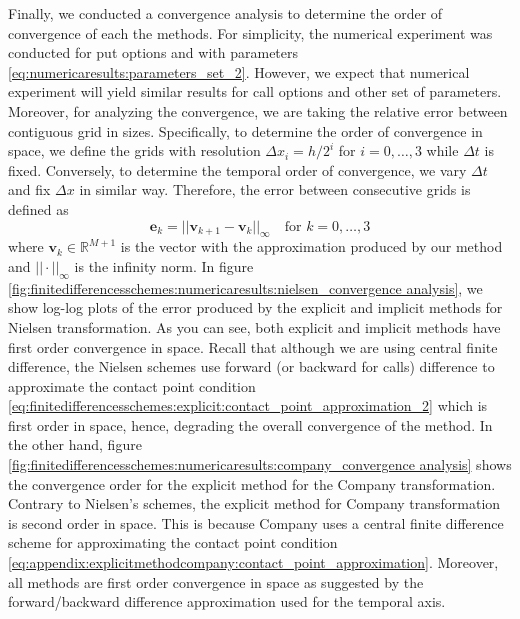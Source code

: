 Finally, we conducted a convergence analysis to determine the order of convergence of each the methods. For simplicity, the numerical experiment was conducted for put options and with parameters \eqref{eq:numericaresults:parameters_set_2}. However, we expect that numerical experiment will yield similar results for call options and other set of parameters. Moreover, for analyzing the convergence, we are taking the relative error between contiguous grid in sizes. Specifically, to determine the order of convergence in space, we define the grids with resolution $\Delta{x}_i=h/2^i$ for $i=0,\dots,3$ while $\Delta{t}$ is fixed. Conversely, to determine the temporal order of convergence, we vary $\Delta{t}$ and fix $\Delta{x}$ in similar way. Therefore, the error between consecutive grids is defined as
\begin{equation}
  \mathbf{e}_k = ||\mathbf{v}_{k+1} - \mathbf{v}_{k}||_{\infty} \quad \text{for $k=0,\dots,3$}
  \label{eq:finitedifferencesschemes:numericalresults:consecutive_error}
\end{equation}
where $\mathbf{v}_{k}\in\mathbb{R}^{M+1}$ is the vector with the approximation produced by our method and $||\cdot||_{\infty}$ is the infinity norm. In figure \eqref{fig:finitedifferencesschemes:numericaresults:nielsen_convergence analysis}, we show log-log plots of the error produced by the explicit and implicit methods for Nielsen transformation. As you can see, both explicit and implicit methods have first order convergence in space. Recall that although we are using central finite difference, the Nielsen schemes use forward (or backward for calls) difference to approximate the contact point condition \eqref{eq:finitedifferencesschemes:explicit:contact_point_approximation_2} which is first order in space, hence, degrading the overall convergence of the method. In the other hand, figure \eqref{fig:finitedifferencesschemes:numericaresults:company_convergence analysis} shows the convergence order for the explicit method for the Company transformation. Contrary to Nielsen's schemes, the explicit method for Company transformation is second order in space. This is because Company uses a central finite difference scheme for approximating the contact point condition \eqref{eq:appendix:explicitmethodcompany:contact_point_approximation}. Moreover, all methods are first order convergence in space as suggested by the forward/backward difference approximation used for the temporal axis.
